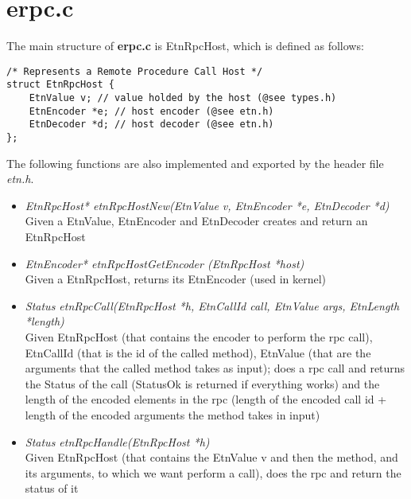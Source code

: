 

\section{erpc.c}

The main structure of \textbf{erpc.c} is EtnRpcHost, which is defined as follows:

\begin{lstlisting}
/* Represents a Remote Procedure Call Host */
struct EtnRpcHost {
	EtnValue v; // value holded by the host (@see types.h)
	EtnEncoder *e; // host encoder (@see etn.h)
	EtnDecoder *d; // host decoder (@see etn.h)
};
\end{lstlisting}

The following functions are also implemented and exported by the header file \emph{etn.h}.

\begin{itemize}

	\item \emph{EtnRpcHost* etnRpcHostNew(EtnValue v, EtnEncoder *e, EtnDecoder *d)}
	\\Given a EtnValue, EtnEncoder and EtnDecoder creates and return an EtnRpcHost

	\item \emph{EtnEncoder* etnRpcHostGetEncoder (EtnRpcHost *host)}
	\\Given a EtnRpcHost, returns its EtnEncoder (used in kernel)

	\item \emph{Status etnRpcCall(EtnRpcHost *h, EtnCallId call, EtnValue args, EtnLength *length)}
	\\Given EtnRpcHost (that contains the encoder to perform the rpc call), EtnCallId (that is the id of the called method), EtnValue (that are the arguments that the called method takes as input); does a rpc call and returns the Status of the call (StatusOk is returned if everything works) and the length of the encoded elements in the rpc (length of the encoded call id + length of the encoded arguments the method takes in input)
 
	\item \emph{Status etnRpcHandle(EtnRpcHost *h)}
	\\Given EtnRpcHost (that contains the EtnValue v and then the method, and its arguments, to which we want perform a call), does the rpc and return the status of it
	
\end{itemize}